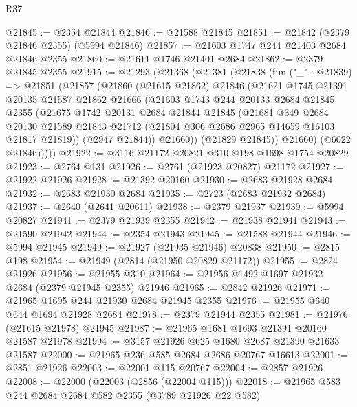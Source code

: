 \begin{lexlean}{R37}
\begin{coremodule}
@21845 := @2354 @21844
@21846 := @21588 @21845
@21851 := @21842 (@2379 @21846 @2355) (@5994 @21846)
@21857 := @21603 @1747 @244 @21403 @2684 @21846 @2355
@21860 := @21611 @1746 @21401 @2684
@21862 := @2379 @21845 @2355
@21915 := @21293
    (@21368
      (@21381
        (@21838
          (fun ("_" : @21839) =>
          @21851
            (@21857
              (@21860
                (@21615 @21862)
                @21846
                (@21621
                  @1745
                  @21391
                  @20135
                  @21587
                  @21862
                  @21666
                  (@21603
                    @1743
                    @244
                    @20133
                    @2684
                    @21845
                    @2355
                    (@21675
                      @1742
                      @20131
                      @2684
                      @21844
                      @21845
                      (@21681
                        @349
                        @2684
                        @20130
                        @21589
                        @21843
                        @21712
                        (@21804 @306 @2686 @2965 @14659 @16103 @21817 @21819))
                      (@2947 @21844))
                    @21660))
                (@21829 @21845))
              @21660)
            (@6022 @21846)))))
@21922 := @3116 @21172 @20821 @310 @198 @1698 @1754 @20829
@21923 := @2764 @131
@21926 := @2761 (@21923 @20827) @21172
@21927 := @21922 @21926
@21928 := @21392 @20160
@21930 := @2683 @21928 @2684
@21932 := @2683 @21930 @2684
@21935 := @2723 (@2683 @21932 @2684)
@21937 := @2640 (@2641 @20611)
@21938 := @2379 @21937
@21939 := @5994 @20827
@21941 := @2379 @21939 @2355
@21942 := @21938 @21941
@21943 := @21590 @21942
@21944 := @2354 @21943
@21945 := @21588 @21944
@21946 := @5994 @21945
@21949 := @21927 (@21935 @21946) @20838
@21950 := @2815 @198
@21954 := @21949 (@2814 (@21950 @20829 @21172))
@21955 := @2824 @21926
@21956 := @21955 @310
@21964 := @21956 @1492 @1697 @21932 @2684 (@2379 @21945 @2355) @21946
@21965 := @2842 @21926
@21971 := @21965 @1695 @244 @21930 @2684 @21945 @2355
@21976 := @21955 @640 @644 @1694 @21928 @2684
@21978 := @2379 @21944 @2355
@21981 := @21976 (@21615 @21978) @21945
@21987 := @21965 @1681 @1693 @21391 @20160 @21587 @21978
@21994 := @3157 @21926 @625 @1680 @2687 @21390 @21633 @21587
@22000 := @21965 @236 @585 @2684 @2686 @20767 @16613
@22001 := @2851 @21926
@22003 := @22001 @115 @20767
@22004 := @2857 @21926
@22008 := @22000 (@22003 (@2856 (@22004 @115)))
@22018 := @21965 @583 @244 @2684 @2684 @582 @2355 (@3789 @21926 @22 @582)

\end{coremodule}
\end{lexlean}
